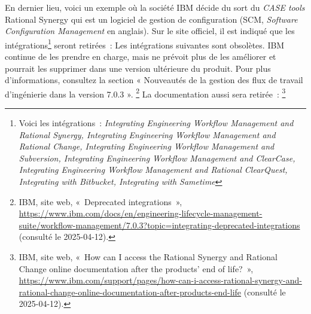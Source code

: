 {En dernier lieu, voici un exemple où la société IBM décide du sort du \textit{CASE tools} Rational Synergy qui est  un logiciel de gestion de configuration (SCM, \textit{Software Configuration Management} en anglais). Sur le site officiel, il est indiqué que les intégrations\footnote{Voici les intégrations~: \textit{Integrating Engineering Workflow Management and Rational Synergy, Integrating Engineering Workflow Management and Rational Change, Integrating Engineering Workflow Management and Subversion, Integrating Engineering Workflow Management and ClearCase, Integrating Engineering Workflow Management and Rational ClearQuest, Integrating with Bitbucket, Integrating with Sametime}} seront retirées~: 
{Les intégrations suivantes sont obsolètes. IBM continue de les prendre en charge, mais ne prévoit plus de les améliorer et pourrait les supprimer dans une version ultérieure du produit. Pour plus d'informations, consultez la section « Nouveautés de la gestion des flux de travail d'ingénierie dans la version 7.0.3 ».}
{\footnote{IBM, site web, «~Deprecated integrations~», \url{https://www.ibm.com/docs/en/engineering-lifecycle-management-suite/workflow-management/7.0.3?topic=integrating-deprecated-integrations} (consulté le 2025-04-12).}}
La documentation aussi sera retirée~:
{\footnote{IBM, site web, «~How can I access the Rational Synergy and Rational Change online documentation after the products' end of life?~», \url{https://www.ibm.com/support/pages/how-can-i-access-rational-synergy-and-rational-change-online-documentation-after-products-end-life} (consulté le 2025-04-12).}}
\vspace{-1\baselineskip}
}{}

